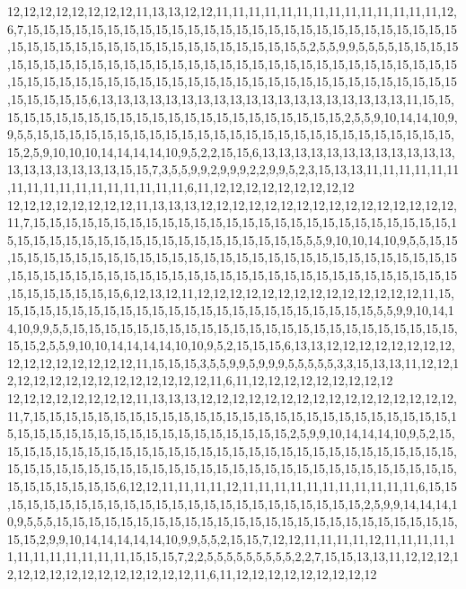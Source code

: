 12,12,12,12,12,12,12,12,11,13,13,12,12,11,11,11,11,11,11,11,11,11,11,11,11,11,11,12,6,7,15,15,15,15,15,15,15,15,15,15,15,15,15,15,15,15,15,15,15,15,15,15,15,15,15,15,15,15,15,15,15,15,15,15,15,15,15,15,15,15,15,15,15,15,15,5,2,5,5,9,9,5,5,5,5,15,15,15,15,15,15,15,15,15,15,15,15,15,15,15,15,15,15,15,15,15,15,15,15,15,15,15,15,15,15,15,15,15,15,15,15,15,15,15,15,15,15,15,15,15,15,15,15,15,15,15,15,15,15,15,15,15,15,15,15,15,15,15,15,15,6,13,13,13,13,13,13,13,13,13,13,13,13,13,13,13,13,13,13,13,11,15,15,15,15,15,15,15,15,15,15,15,15,15,15,15,15,15,15,15,15,15,15,15,2,5,5,9,10,14,14,10,9,9,5,5,15,15,15,15,15,15,15,15,15,15,15,15,15,15,15,15,15,15,15,15,15,15,15,15,15,15,15,2,5,9,10,10,10,14,14,14,14,10,9,5,2,2,15,15,6,13,13,13,13,13,13,13,13,13,13,13,13,13,13,13,13,13,13,13,15,15,7,3,5,5,9,9,2,9,9,9,2,2,9,9,5,2,3,15,13,13,11,11,11,11,11,11,11,11,11,11,11,11,11,11,11,11,11,6,11,12,12,12,12,12,12,12,12,12
12,12,12,12,12,12,12,12,11,13,13,13,12,12,12,12,12,12,12,12,12,12,12,12,12,12,12,12,11,7,15,15,15,15,15,15,15,15,15,15,15,15,15,15,15,15,15,15,15,15,15,15,15,15,15,15,15,15,15,15,15,15,15,15,15,15,15,15,15,15,15,15,15,15,15,5,5,9,10,10,14,10,9,5,5,15,15,15,15,15,15,15,15,15,15,15,15,15,15,15,15,15,15,15,15,15,15,15,15,15,15,15,15,15,15,15,15,15,15,15,15,15,15,15,15,15,15,15,15,15,15,15,15,15,15,15,15,15,15,15,15,15,15,15,15,15,15,15,15,15,6,12,13,12,11,12,12,12,12,12,12,12,12,12,12,12,12,12,12,11,15,15,15,15,15,15,15,15,15,15,15,15,15,15,15,15,15,15,15,15,15,15,15,15,5,5,9,9,10,14,14,10,9,9,5,5,15,15,15,15,15,15,15,15,15,15,15,15,15,15,15,15,15,15,15,15,15,15,15,15,15,15,2,5,5,9,10,10,14,14,14,14,10,10,9,5,2,15,15,15,6,13,13,12,12,12,12,12,12,12,12,12,12,12,12,12,12,12,12,11,15,15,15,3,5,5,9,9,5,9,9,9,5,5,5,5,5,3,3,15,13,13,11,12,12,12,12,12,12,12,12,12,12,12,12,12,12,12,11,6,11,12,12,12,12,12,12,12,12,12
12,12,12,12,12,12,12,12,11,13,13,13,12,12,12,12,12,12,12,12,12,12,12,12,12,12,12,12,11,7,15,15,15,15,15,15,15,15,15,15,15,15,15,15,15,15,15,15,15,15,15,15,15,15,15,15,15,15,15,15,15,15,15,15,15,15,15,15,15,15,15,15,15,15,2,5,9,9,10,14,14,14,10,9,5,2,15,15,15,15,15,15,15,15,15,15,15,15,15,15,15,15,15,15,15,15,15,15,15,15,15,15,15,15,15,15,15,15,15,15,15,15,15,15,15,15,15,15,15,15,15,15,15,15,15,15,15,15,15,15,15,15,15,15,15,15,15,15,15,15,6,12,12,11,11,11,11,12,11,11,11,11,11,11,11,11,11,11,11,6,15,15,15,15,15,15,15,15,15,15,15,15,15,15,15,15,15,15,15,15,15,15,15,15,2,5,9,9,14,14,14,10,9,5,5,5,15,15,15,15,15,15,15,15,15,15,15,15,15,15,15,15,15,15,15,15,15,15,15,15,15,15,15,2,9,9,10,14,14,14,14,14,10,9,9,5,5,2,15,15,7,12,12,11,11,11,11,12,11,11,11,11,11,11,11,11,11,11,11,11,15,15,15,7,2,2,5,5,5,5,5,5,5,5,5,2,2,7,15,15,13,13,11,12,12,12,12,12,12,12,12,12,12,12,12,12,12,12,11,6,11,12,12,12,12,12,12,12,12,12
